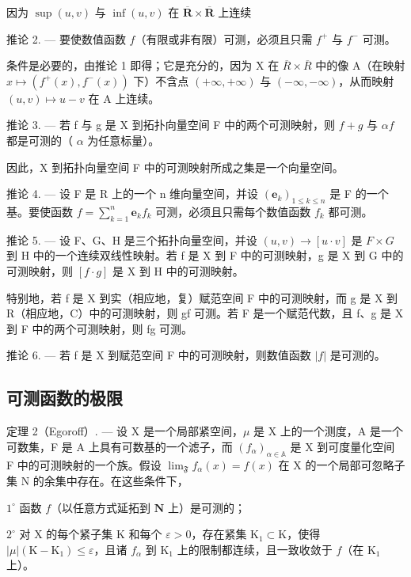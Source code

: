 因为 \(\sup (u,v)\) 与 \(\inf (u,v)\) 在 \(\overline{\mathbf{R}}\times \overline{\mathbf{R}}\) 上连续

推论 2. --- 要使数值函数 \(f\)（有限或非有限）可测，必须且只需 \(f^{+}\) 与 \(f^{-}\) 可测。

条件是必要的，由推论 1 即得；它是充分的，因为 X 在 \(\overline{R} \times \overline{R}\) 中的像 A（在映射 \(x \mapsto (f^{+}(x), f^{-}(x))\) 下）不含点 \((+\infty, +\infty)\) 与 \((-\infty, -\infty)\)，从而映射 \((u, v) \mapsto u - v\) 在 A 上连续。

推论 3. --- 若 f 与 g 是 X 到拓扑向量空间 F 中的两个可测映射，则 \(f + g\) 与 \(\alpha f\) 都是可测的（ \(\alpha\) 为任意标量）。

因此，X 到拓扑向量空间 F 中的可测映射所成之集是一个向量空间。

推论 4. --- 设 F 是 R 上的一个 n 维向量空间，并设 \((\mathbf{e}_{k})_{1\leqslant k\leqslant n}\) 是 F 的一个基。要使函数 \(f=\sum_{k=1}^{n}\mathbf{e}_{k}f_{k}\) 可测，必须且只需每个数值函数 \(f_{k}\) 都可测。

推论 5. --- 设 F、G、H 是三个拓扑向量空间，并设 \((u, v) \to [u \cdot v]\) 是 \(F \times G\) 到 H 中的一个连续双线性映射。若 f 是 X 到 F 中的可测映射，g 是 X 到 G 中的可测映射，则 \([f \cdot g]\) 是 X 到 H 中的可测映射。

特别地，若 f 是 X 到实（相应地，复）赋范空间 F 中的可测映射，而 g 是 X 到 R（相应地，C）中的可测映射，则 gf 可测。若 F 是一个赋范代数，且 f、g 是 X 到 F 中的两个可测映射，则 fg 可测。

推论 6. --- 若 f 是 X 到赋范空间 F 中的可测映射，则数值函数 \(|f|\) 是可测的。

\subsection{可测函数的极限}

定理 2（Egoroff）. --- 设 X 是一个局部紧空间，\(\mu\) 是 X 上的一个测度，A 是一个可数集，F 是 A 上具有可数基的一个滤子，而 \((f_{\alpha})_{\alpha\in\mathbb{A}}\) 是 X 到可度量化空间 F 中的可测映射的一个族。假设 \(\lim_{\mathfrak{F}} f_{\alpha}(x) = f(x)\) 在 X 的一个局部可忽略子集 N 的余集中存在。在这些条件下，

\(1^{\circ}\) 函数 \(f\)（以任意方式延拓到 \(\mathbf{N}\) 上）是可测的；

\(2^{\circ}\) 对 X 的每个紧子集 K 和每个 \(\varepsilon > 0\)，存在紧集 \(\mathrm{K}_{1} \subset \mathrm{K}\)，使得 \(|\mu| (\mathrm{K} - \mathrm{K}_{1}) \leqslant \varepsilon\)，且诸 \(f_{\alpha}\) 到 \(\mathrm{K}_{1}\) 上的限制都连续，且一致收敛于 \(f\)（在 \(\mathrm{K}_{1}\) 上）。

